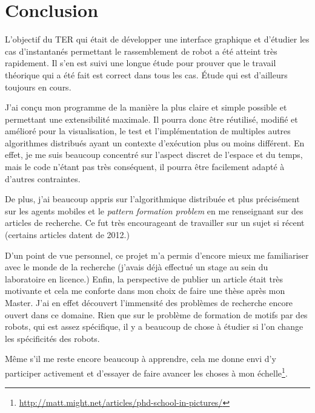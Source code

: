\section*{Conclusion}

L'objectif du TER qui était de développer une interface graphique et d'étudier
les cas d'instantanés permettant le rassemblement de robot a été atteint très
rapidement. Il s'en est suivi une longue étude pour prouver que le travail
théorique qui a été fait est correct dans tous les cas. \'Etude qui est
d'ailleurs toujours en cours.

J'ai conçu mon programme de la manière la plus claire et simple possible et permettant
une extensibilité maximale. Il pourra donc être réutilisé, modifié et amélioré
pour la visualisation, le test et l'implémentation de multiples autres
algorithmes distribués ayant un contexte d'exécution plus ou moins différent.
En effet, je me suis beaucoup concentré sur l'aspect discret de l'espace et du
temps, mais le code n'étant pas très conséquent, il pourra être facilement
adapté à d'autres contraintes.

De plus, j'ai beaucoup appris sur l'algorithmique distribuée et plus
précisément sur les agents mobiles et le \emph{pattern formation problem} en me
renseignant sur des articles de recherche. Ce fut très encourageant de
travailler sur un sujet si récent (certains articles datent de 2012.)

D'un point de vue personnel, ce projet m'a permis d'encore mieux me
familiariser avec le monde de la recherche (j'avais déjà effectué un
stage au sein du laboratoire en licence.) Enfin, la perspective de publier un
article était très motivante et cela me conforte dans mon choix de faire une
thèse après mon Master. J'ai en effet découvert l'immensité des problèmes de
recherche encore ouvert dans ce domaine. Rien que sur le problème de formation
de motifs par des robots, qui est assez spécifique, il y a beaucoup de
chose à étudier si l'on change les spécificités des robots.

Même s'il me reste
encore beaucoup à apprendre, cela me donne envi d'y participer activement et
d'essayer de faire avancer les choses à mon
échelle\footnote{\url{http://matt.might.net/articles/phd-school-in-pictures/}}.

